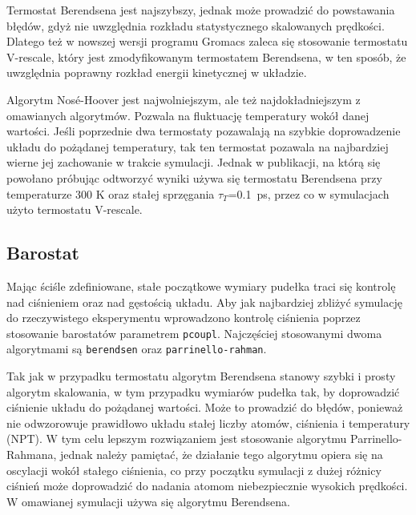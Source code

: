 Termostat Berendsena jest najszybszy, jednak może prowadzić do powstawania błędów, gdyż nie uwzględnia rozkładu statystycznego skalowanych prędkości. Dlatego też w nowszej wersji programu Gromacs zaleca się stosowanie termostatu V-rescale, który jest zmodyfikowanym termostatem Berendsena, w ten sposób,  że uwzględnia poprawny rozkład energii kinetycznej w układzie.

Algorytm Nosé-Hoover jest najwolniejszym, ale też najdokładniejszym z omawianych algorytmów. Pozwala na fluktuację temperatury wokół danej wartości. Jeśli poprzednie dwa termostaty pozawalają na szybkie doprowadzenie układu do pożądanej temperatury, tak ten termostat pozawala na najbardziej wierne jej zachowanie w trakcie symulacji. Jednak w publikacji, na którą się powołano próbując odtworzyć wyniki \cite{1tki} używa się termostatu Berendsena przy temperaturze 300 K oraz stałej sprzęgania $\tau_{T}$=0.1~ps, przez co w symulacjach użyto termostatu V-rescale.

\subsection{Barostat}

Mając ściśle zdefiniowane, stałe początkowe wymiary pudełka traci się kontrolę nad ciśnieniem oraz nad gęstością układu. Aby jak najbardziej zbliżyć symulację do rzeczywistego eksperymentu wprowadzono kontrolę ciśnienia poprzez stosowanie barostatów parametrem \texttt{pcoupl}. Najczęściej stosowanymi dwoma algorytmami są \texttt{berendsen} oraz \texttt{parrinello-rahman}.

Tak jak w przypadku termostatu algorytm Berendsena stanowy szybki i prosty algorytm skalowania, w tym przypadku wymiarów pudełka tak, by doprowadzić ciśnienie układu do pożądanej wartości. Może to prowadzić do błędów, ponieważ nie odwzorowuje prawidłowo układu stałej liczby atomów, ciśnienia i temperatury (NPT). W tym celu lepszym rozwiązaniem jest stosowanie algorytmu Parrinello-Rahmana, jednak należy pamiętać, że działanie tego algorytmu opiera się na oscylacji wokół stałego ciśnienia, co przy początku symulacji z dużej różnicy ciśnień może doprowadzić do nadania atomom niebezpiecznie wysokich prędkości. W omawianej symulacji używa się algorytmu Berendsena.

